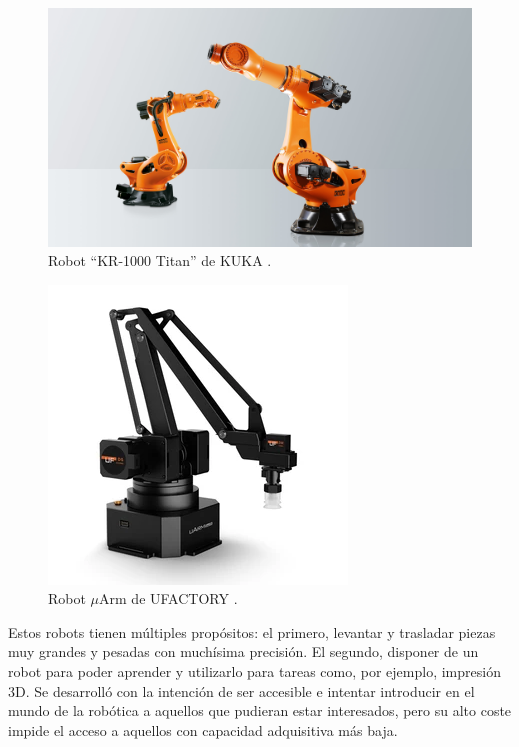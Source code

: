 \begin{figure}[H]
    \centering
    \includegraphics[width=.75\linewidth]{pictures/kr1000.jpg}
    \caption{Robot ``KR-1000 Titan'' de KUKA \cite{KR1000Titana}.}
    \label{fig:kuka}
\end{figure}

\begin{figure}[H]
    \centering
    \includegraphics[width=.5\linewidth]{pictures/uarm.png}
    \caption{Robot $\mu$Arm de UFACTORY \cite{UFACTORYOfficialWebsitea}.}
    \label{fig:uarm}
\end{figure}

Estos robots tienen múltiples propósitos: el primero, levantar y trasladar piezas
muy grandes y pesadas con muchísima precisión. El segundo, disponer de un robot
para poder aprender y utilizarlo para tareas como, por ejemplo, impresión 3D. 
Se desarrolló con la intención de ser accesible e intentar introducir en el mundo
de la robótica a aquellos que pudieran estar interesados, pero su alto coste impide
el acceso a aquellos con capacidad adquisitiva más baja.
